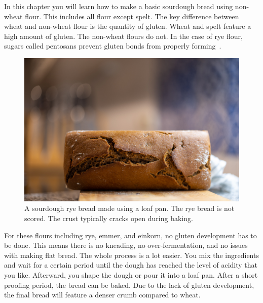 \begin{quoting}
In this chapter you will learn how to make a basic sourdough bread
using non-wheat flour. This includes all flour except spelt.
The key difference between wheat and non-wheat flour is
the quantity of gluten. Wheat and spelt feature a high amount
of gluten. The non-wheat flours do not. In the case of rye flour,
sugars called pentosans prevent gluten bonds from properly
forming~\cite{rye+pentosans}.
\end{quoting}

\begin{figure}[!htb]
  \includegraphics[width=\textwidth]{final-bread}
  \caption[Sourdough rye bread]{A sourdough rye bread made using a loaf pan.
      The rye bread is not scored. The crust typically cracks open during
      baking.}%
  \label{fig:non-wheat-final-bread}
\end{figure}

For these flours including rye, emmer, and einkorn, no gluten
development has to be done. This means there is no kneading,
no over-fermentation, and no issues with making flat bread.
The whole process
is a lot easier. You mix the ingredients and
wait for a certain period until the dough has
reached the level of acidity that you like. Afterward, you
shape the dough or pour it into a loaf pan. After a short proofing
period, the bread can be baked. Due to the lack
of gluten development, the final bread will feature a denser
crumb compared to wheat.

\begin{flowchart}[!htb]
\begin{center}
  
  \caption[Process for non-wheat sourdough bread]{A visualization of the
      process to make non-wheat sourdough bread.  The process is much simpler
      than making wheat sourdough bread. There is no gluten development. The
      ingredients are simply mixed together.}%
  \label{fig:non-wheat-sourdough}
\end{center}
\end{flowchart}

